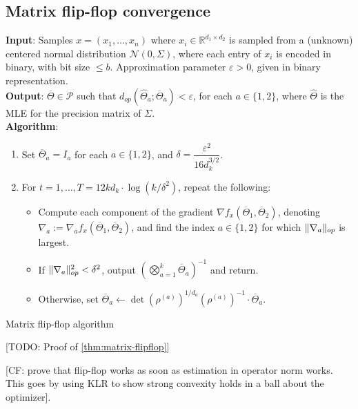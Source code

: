 \documentclass[aos]{imsart}
\theoremstyle{definition}
\DeclarePairedDelimiter{\norm}{\lVert}{\rVert}
\newcommand{\R}{{\mathbb{R}}}
\newcommand{\otheta}{\overline{\Theta}}
\newcommand{\htheta}{\widehat{\Theta}}
\newcommand{\eps}{\varepsilon}
\newcommand{\cN}{\mathcal{N}}
\newcommand{\SPD}{\mathcal{P}}
\newcommand{\samp}{x}
\newcommand{\CF}[1]{{\color{purple}[CF: #1]}}
\newcommand{\TODO}[1]{{\color{blue}[TODO: #1]}}
\begin{document}
\subsection{Matrix flip-flop convergence}
\begin{Algorithm}
\textbf{Input}: Samples $\samp = (\samp_1, \ldots, \samp_n)$ where $\samp_i \in \R^{d_1 \times d_2}$ is sampled from a (unknown) centered normal distribution $\cN(0, \Sigma)$, where each entry of $\samp_i$ is encoded in binary, with bit size $\le b$. Approximation parameter $\eps > 0$, given in binary representation. \\[.3ex]

\textbf{Output}: $\otheta \in \SPD$ such that $d_{op}(\htheta_a; \otheta_a) < \eps$, for each $a \in \{1,2\}$, where $\htheta$ is the MLE for the precision matrix of $\Sigma$. \\[.3ex]

\textbf{Algorithm}:
\begin{enumerate}
\item\label{it:flip-flop step 1} Set $\otheta_a = I_a$ for each $a \in \{1,2\}$, and $\delta = \dfrac{\eps^2}{16 d_k^{3/2}}$.
\item\label{it:flip-flop step 2} For $t=1,\dots,T = 12 k d_k \cdot \log(k/\delta^2)$, repeat the following:
\begin{itemize}
\item Compute each component of the gradient $\nabla f_{\samp}(\otheta_1, \otheta_2)$, denoting $\nabla_a := \nabla_a f_{\samp}(\otheta_1, \otheta_2)$, and find the index $a \in \{1,2\}$ for which $\norm{\nabla_a}_{op}$ is largest.
\item
If $\norm{\nabla_a}_{op}^2 < \delta^2$, output $\left( \bigotimes_{a =1}^k \otheta_a \right)^{-1}$ and return.
\item Otherwise, set $\otheta_a \leftarrow \det(\rho^{(a)})^{1/d_a} (\rho^{(a)})^{-1} \cdot \otheta_a$.
\end{itemize}
\end{enumerate}
\caption{Matrix flip-flop algorithm}\label{alg:flip-flop}
\end{Algorithm}

\TODO{Proof of \cref{thm:matrix-flipflop}}


\CF{prove that flip-flop works as soon as estimation in operator norm works. This goes by using KLR to show strong convexity holds in a ball about the optimizer}.
\end{document}
